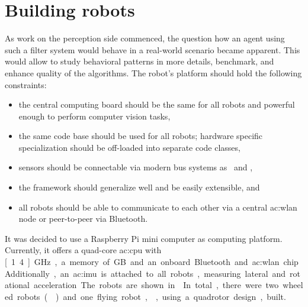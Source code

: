 \section{Building robots}


As work on the perception side commenced, the question how an agent using such a filter system would behave in a real-world scenario became apparent.
This would allow to study behavioral patterns in more details, benchmark, and enhance quality of the algorithms.
The robot's platform should hold the following constraints:

\begin{itemize}
  \item the central computing board should be the same for all robots and powerful enough to perform computer vision tasks,
  \item the same code base should be used for all robots; hardware specific specialization should be off-loaded into separate code classes,
  \item sensors should be connectable via modern bus systems as \wire\ and \ic,
  \item the framework should generalize well and be easily extensible, and
  \item all robots should be able to communicate to each other via a central \gls{ac:wlan} node or peer-to-peer via Bluetooth.
\end{itemize}

It was decided to use a Raspberry Pi mini computer as computing platform.
Currently, it offers a quad-core \gls{ac:cpu} with \unit[1.4]{GHz}, a memory of \unit[1]{GB} and an onboard Bluetooth and \gls{ac:wlan} chip.
Additionally, an \gls{ac:imu} is attached to all robots, measuring lateral and rotational acceleration.
The robots are shown in .
In total, there were two wheeled robots () and one flying robot, , using a quadrotor design, built.

